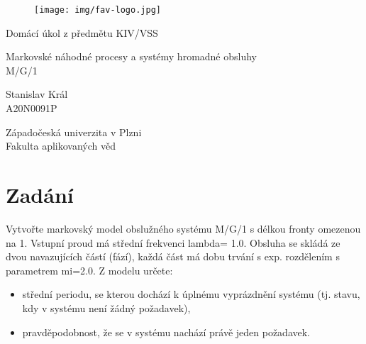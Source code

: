 \documentclass[12pt, a4paper]{article}
\let\oldsection\section
\renewcommand\section{\clearpage\oldsection}
\begin{document}
	\renewcommand{\lstlistingname}{Ukázka kódu}
	\renewcommand{\lstlistlistingname}{Seznam ukázek kódu}
    \begin{titlepage}

        \centering

        \vspace*{\baselineskip}
        \begin{figure}[H]
        \centering
        \texttt{[image: img/fav-logo.jpg]}
        \end{figure}

        \vspace*{1\baselineskip}

        \vspace{0.75\baselineskip}

        \vspace{0.5\baselineskip}
        {Domácí úkol z předmětu KIV/VSS}

        {\LARGE\sc Markovské náhodné procesy a systémy hromadné obsluhy\\}
        {\sc M/G/1\\}

        \vspace{4\baselineskip}

        \vspace{0.5\baselineskip}

        {\sc\Large Stanislav Král \\}
        \vspace{0.5\baselineskip}
        {A20N0091P}

        \vfill

        {\sc Západočeská univerzita v Plzni\\
        Fakulta aplikovaných věd}

    \end{titlepage}

    \tableofcontents
    \pagebreak

\section{Zadání}
Vytvořte markovský model obslužného systému M/G/1 s délkou fronty omezenou na 1. Vstupní proud má střední frekvenci lambda= 1.0. Obsluha se skládá ze dvou navazujících částí (fází), každá část má dobu trvání s exp. rozdělením s parametrem mi=2.0. Z modelu určete:
\begin{itemize}
    \item střední periodu, se kterou dochází k úplnému vyprázdnění systému (tj. stavu, kdy v systému není žádný požadavek),
    \item pravděpodobnost, že se v systému nachází právě jeden požadavek.
\end{itemize}
\end{document}
